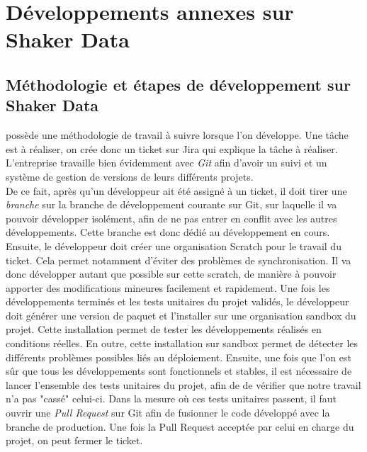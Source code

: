\documentclass[12pt,oneside,noprintercorrection]{iut}
\begin{document}
\section{Développements annexes sur Shaker Data}
 \subsection{Méthodologie et étapes de développement sur Shaker Data}
 \gz{} possède une méthodologie de travail à suivre lorsque l'on développe. Une tâche est à réaliser, on crée donc un ticket sur Jira qui explique la tâche à réaliser. L'entreprise travaille bien évidemment avec \textit{Git} afin d'avoir un suivi et un système de gestion de versions de leurs différents projets. 
 ~\\\indent De ce fait, après qu'un développeur ait été assigné à un ticket, il doit tirer une \textit{branche} sur la branche de développement courante sur Git, sur laquelle il va pouvoir développer isolément, afin de ne pas entrer en conflit avec les autres développements. Cette branche est donc dédié au développement en cours. Ensuite, le développeur doit créer une organisation Scratch pour le travail du ticket. Cela permet notamment d'éviter des problèmes de synchronisation. Il va donc développer autant que possible sur cette scratch, de manière à pouvoir apporter des modifications mineures facilement et rapidement. Une fois les développements terminés et les tests unitaires du projet validés, le développeur doit générer une version de paquet et l'installer sur une organisation sandbox du projet. Cette installation permet de tester les développements réalisés en conditions réelles. En outre, cette installation sur sandbox permet de détecter les différents problèmes possibles liés au déploiement. Ensuite, une fois que l'on est sûr que tous les développements sont fonctionnels et stables, il est nécessaire de lancer l'ensemble des tests unitaires du projet, afin de de vérifier que notre travail n'a pas "cassé" celui-ci. Dans la mesure où ces tests unitaires passent, il faut ouvrir une \textit{Pull Request} sur Git afin de fusionner le code développé avec la branche de production. Une fois la Pull Request acceptée par celui en charge du projet, on peut fermer le ticket.
 
\end{document}
